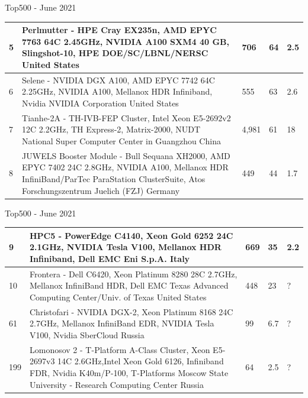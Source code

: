 \documentclass{beamer}
\begin{document}

\begin{frame}{Top500 - June 2021}
	\begin{table}
		\centering %
\small		
                \begin{tabular}{p{0.1cm} p{8cm} p{0.7cm} p{0.5cm} p{0.5cm}}
			 5 &    Perlmutter - HPE Cray EX235n, AMD EPYC 7763 64C 2.45GHz, NVIDIA A100 SXM4 40 GB, Slingshot-10, HPE DOE/SC/LBNL/NERSC United States    & 706 & 64 &2.5\\
			\midrule
                            6 &  Selene - NVIDIA DGX A100, AMD EPYC 7742 64C 2.25GHz, NVIDIA A100, Mellanox HDR Infiniband, Nvidia NVIDIA Corporation United States & 555 & 63 & 2.6 \\
			\midrule
                            7 &   Tianhe-2A - TH-IVB-FEP Cluster, Intel Xeon E5-2692v2 12C 2.2GHz, TH Express-2, Matrix-2000, NUDT National Super Computer Center in Guangzhou China & 4,981 & 61 & 18 \\
			\midrule
                            8 &   JUWELS Booster Module - Bull Sequana XH2000, AMD EPYC 7402 24C 2.8GHz, NVIDIA A100, Mellanox HDR InfiniBand/ParTec ParaStation ClusterSuite, Atos Forschungszentrum Juelich (FZJ) Germany  & 449 & 44 & 1.7 \\
			
		\end{tabular}
	\end{table}
\end{frame}


\begin{frame}{Top500 - June 2021}
	\begin{table}
		\centering %
\small		
                \begin{tabular}{p{0.2cm} p{8cm} p{0.7cm} p{0.5cm} p{0.5cm}}
			9 &     	HPC5 - PowerEdge C4140, Xeon Gold 6252 24C 2.1GHz, NVIDIA Tesla V100, Mellanox HDR Infiniband, Dell EMC
Eni S.p.A.  Italy     & 669 & 35 &2.2\\
			\midrule
                            10 &   Frontera - Dell C6420, Xeon Platinum 8280 28C 2.7GHz, Mellanox InfiniBand HDR, Dell EMC Texas Advanced Computing Center/Univ. of Texas United States  & 448 & 23 & ? \\
			\midrule
                            61 &    Christofari - NVIDIA DGX-2, Xeon Platinum 8168 24C 2.7GHz, Mellanox InfiniBand EDR, NVIDIA Tesla V100, Nvidia
SberCloud Russia  & 99 & 6.7 & ?\\
			\midrule
                            199 &     Lomonosov 2 - T-Platform A-Class Cluster, Xeon E5-2697v3 14C 2.6GHz,Intel Xeon Gold 6126, Infiniband FDR, Nvidia K40m/P-100, T-Platforms Moscow State University - Research Computing Center
Russia  & 64 & 2.5 & ? \\
		\end{tabular}
	\end{table}
\end{frame}
\end{document}
